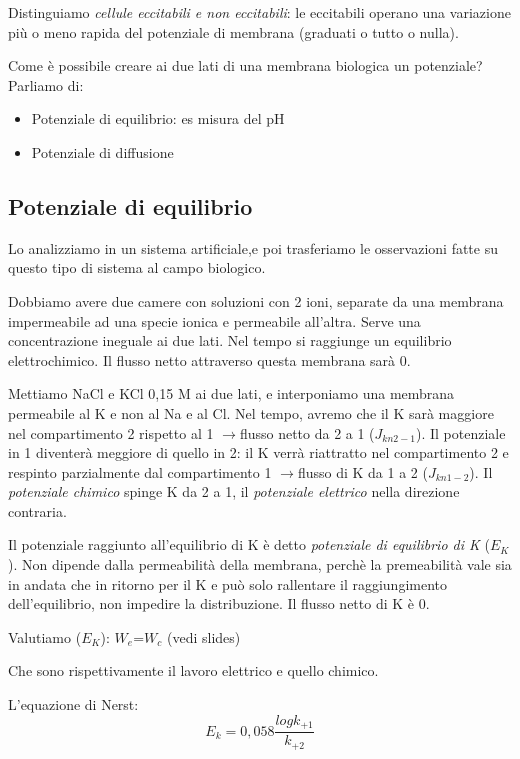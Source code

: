 \documentclass[a4paper,12pt]{article}
\newcommand{\lfreccia}{\ensuremath{\longrightarrow}}
\begin{document}
Distinguiamo \emph{cellule eccitabili e non eccitabili}: le eccitabili operano una variazione più o meno rapida del potenziale di membrana (graduati o tutto o nulla).

Come è possibile creare ai due lati di una membrana biologica un potenziale?
Parliamo di:
\begin{itemize}
\item{Potenziale di equilibrio: es misura del pH}
\item{Potenziale di diffusione}
\end{itemize}

\subsection{Potenziale di equilibrio}

Lo analizziamo in un sistema artificiale,e poi trasferiamo le osservazioni fatte su questo tipo di sistema al campo biologico.

Dobbiamo avere due camere con soluzioni con 2 ioni, separate da una membrana impermeabile ad una specie ionica e permeabile all’altra. Serve una concentrazione ineguale ai due lati. Nel tempo si raggiunge un equilibrio elettrochimico. Il flusso netto attraverso questa membrana sarà 0.

Mettiamo NaCl e KCl 0,15 M ai due lati, e interponiamo una membrana permeabile al K e non al Na e al Cl. Nel tempo, avremo che il K sarà maggiore nel compartimento 2 rispetto al 1 \lfreccia flusso netto da 2 a 1 ($J_{kn 2-1}$). Il potenziale in 1 diventerà meggiore di quello in 2: il K verrà riattratto nel compartimento 2 e respinto parzialmente dal compartimento 1 \lfreccia flusso di K da 1 a 2 ($J_{kn 1-2}$). Il \emph{potenziale chimico} spinge K da 2 a 1, il \emph{potenziale elettrico} nella direzione contraria.

Il potenziale raggiunto all’equilibrio di K è detto \emph{potenziale di equilibrio di K} ($E_{K}$). Non dipende dalla permeabilità della membrana, perchè la premeabilità vale sia in andata che in ritorno per il K e può solo rallentare il raggiungimento dell’equilibrio, non impedire la distribuzione. Il flusso netto di K è 0.

Valutiamo ($E_{K}$): $W_{e}$=$W_{c}$ (vedi slides)

Che sono rispettivamente il lavoro elettrico e quello chimico.

L'equazione di Nerst: 
\begin{equation}
E_{k}=0,058 \frac{log k_{+1}}{k_{+2}}
\end{equation}
\end{document}

